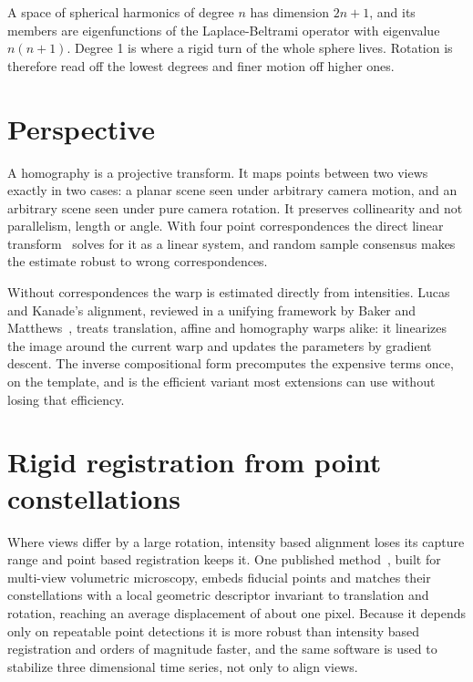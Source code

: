 A space of spherical harmonics of degree \(n\) has dimension \(2n+1\), and its members are
eigenfunctions of the Laplace-Beltrami operator with eigenvalue \(n(n+1)\). Degree 1 is where a rigid
turn of the whole sphere lives. Rotation is therefore read off the lowest degrees and finer
motion off higher ones.

\section{Perspective}

A homography is a projective transform. It maps points between two views exactly in two cases: a
planar scene seen under arbitrary camera motion, and an arbitrary scene seen under pure camera
rotation. It preserves collinearity and not parallelism, length or angle. With four point
correspondences the direct linear transform~\cite{src:Wikipedia-Direct-linear-transformation} solves for it as a linear system, and random sample
consensus makes the estimate robust to wrong correspondences.

Without correspondences the warp is estimated directly from intensities. Lucas and Kanade's
alignment, reviewed in a unifying framework by Baker and Matthews~\cite{src:Baker-and-Matthews-2004}, treats translation, affine and
homography warps alike: it linearizes the image around the current warp and updates the parameters
by gradient descent. The inverse compositional form precomputes the expensive terms once, on the
template, and is the efficient variant most extensions can use without losing that efficiency.

\section{Rigid registration from point constellations}

Where views differ by a large rotation, intensity based alignment loses its capture range and point
based registration keeps it. One published method~\cite{src:Preibisch-Saalfeld-Schindelin-and-Tomancak-2010}, built for multi-view volumetric microscopy,
embeds fiducial points and matches their constellations with a local geometric descriptor invariant
to translation and rotation, reaching an average displacement of about one pixel. Because it depends
only on repeatable point detections it is more robust than intensity based registration and orders of
magnitude faster, and the same software is used to stabilize three dimensional time series, not only
to align views.
